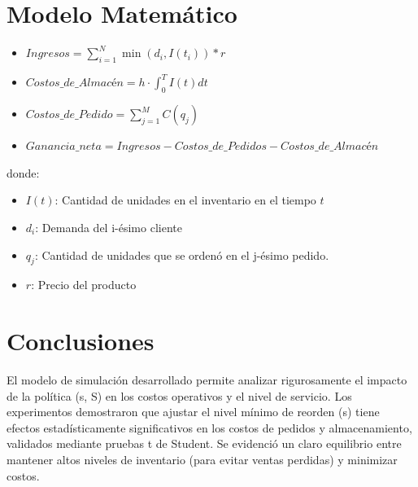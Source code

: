 \documentclass{article}
\begin{document}
\section{Modelo Matemático}
\begin{itemize}
    \item $Ingresos = \sum_{i=1}^{N} \min(d_i, I(t_i)) * r$
    \item $Costos\_de\_Almacén = h \cdot \int_{0}^{T} I(t) dt$
    \item $Costos\_de\_Pedido = \sum_{j=1}^{M} C(q_j)$
    \item $Ganancia\_neta= Ingresos - Costos\_de\_Pedidos - Costos\_de\_Almacén$
\end{itemize}

donde:
\begin{itemize}
    \item $I(t)$: Cantidad de unidades en el inventario en el tiempo $t$
    \item $d_i$: Demanda del i-ésimo cliente
    \item $q_j$: Cantidad de unidades que se ordenó en el j-ésimo pedido.
    \item $r$: Precio del producto
\end{itemize}

\section{Conclusiones}
El modelo de simulación desarrollado permite analizar rigurosamente el impacto de la política (s, S) en los costos operativos y el nivel de servicio. Los experimentos demostraron que ajustar el nivel mínimo de reorden (s) tiene efectos estadísticamente significativos en los costos de pedidos y almacenamiento, validados mediante pruebas t de Student. Se evidenció un claro equilibrio entre mantener altos niveles de inventario (para evitar ventas perdidas) y minimizar costos.
\end{document}
